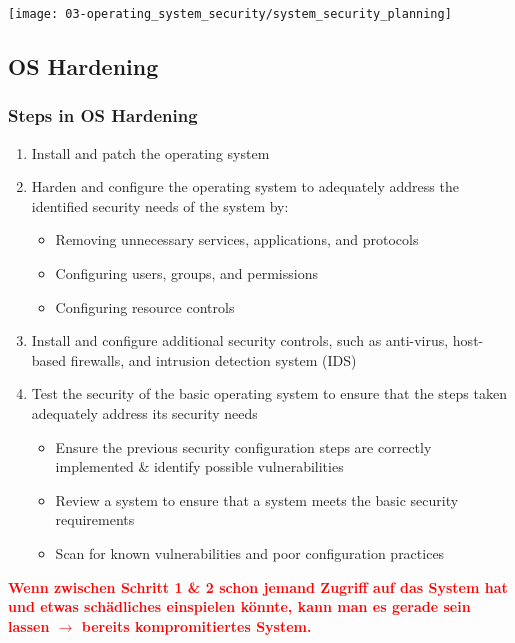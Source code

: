 \begin{center}
    \vspace{-8pt}
    \texttt{[image: 03-operating\_system\_security/system\_security\_planning]}
    \vspace{-8pt}
\end{center}

\subsection{OS Hardening}

\subsubsection{Steps in OS Hardening}
\begin{enumerate}
    \item Install and patch the operating system
    \item Harden and configure the operating system to adequately address the identified security needs of the system by:
    \begin{itemize}
        \item Removing unnecessary services, applications, and protocols
        \item Configuring users, groups, and permissions
        \item Configuring resource controls
    \end{itemize}
    \item Install and configure additional security controls, such as anti-virus, host-based firewalls, and intrusion detection system (IDS)
    \item Test the security of the basic operating system to ensure that the steps taken adequately address its security needs
    \begin{itemize}
        \item Ensure the previous security configuration steps are correctly implemented \& identify possible vulnerabilities
        \item Review a system to ensure that a system meets the basic security requirements
        \item Scan for known vulnerabilities and poor configuration practices\\
    \end{itemize}
\end{enumerate}

\textcolor{red}{\textbf{Wenn zwischen Schritt 1 \& 2 schon jemand Zugriff auf das System hat und etwas schädliches einspielen könnte, kann man es gerade sein lassen $\rightarrow$ bereits kompromitiertes System.}}

